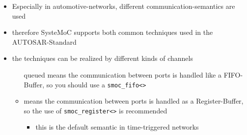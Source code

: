 \begin{frame}[fragile=singleslide]
\begin{itemize}
\item Especially in automotive-networks, different communication-semantics are used
\item therefore SysteMoC supports both common techniques used in the AUTOSAR-Standard
\item the techniques can be realized by different kinds of channels
\begin{itemize}
\item[queued] means the communication between ports is handled like a FIFO-Buffer, so you should use a \lstinline{smoc_fifo<>}
\item[last-is-best] means the communication between ports is handled as a Register-Buffer, so the use of \lstinline{smoc_register<>} is recommended
\begin{itemize}
\item this is the default semantic in time-triggered networks
\end{itemize}
\end{itemize}
\end{itemize}
\end{frame}


